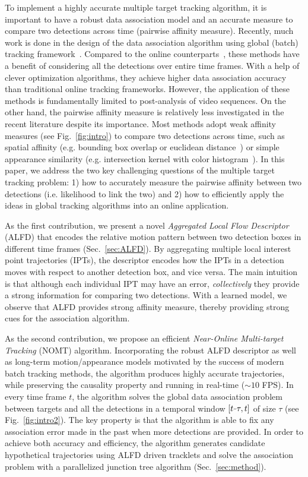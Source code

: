\documentclass[10pt,twocolumn,letterpaper]{article}
\newcommand{\minus}{\scalebox{0.5}[1.0]{$-$}}
\begin{document}
To implement a highly accurate multiple target tracking algorithm, it is important to have a robust data association model and an accurate measure to compare two detections across time (pairwise affinity measure). Recently, much work is done in the design of the data association algorithm using global (batch) tracking framework~\cite{BerclazFTF11,Kuo_CVPR_10,Milan:2014:CEM,Zhang_CVPR_08}. 
Compared to the online counterparts~\cite{BreitensteinICCV09,choi_pami13,Ess_PAMI_09,Khan_PAMI_05}, these methods have a benefit of considering all the detections over entire time frames. With a help of clever optimization algorithms, they achieve higher data association accuracy than traditional online tracking frameworks. However, the application of these methods is fundamentally limited to post-analysis of video sequences. 
On the other hand, the pairwise affinity measure is relatively less investigated in the recent literature despite its importance. Most methods adopt weak affinity measures (see Fig.~\ref{fig:intro}) to compare two detections across time, such as spatial affinity (e.g. bounding box overlap or euclidean distance~\cite{Andriyenko:2012:DCO,BerclazFTF11,Pirsiavash_CVPR_11}) or simple appearance similarity (e.g. intersection kernel with color histogram~\cite{ZamirECCV12}). In this paper, we address the two key challenging questions of the multiple target tracking problem: 1) how to accurately measure the pairwise affinity between two detections (i.e. likelihood to link the two) and 2) how to efficiently apply the ideas in global tracking algorithms into an online application. 

As the first contribution, we present a novel \emph{Aggregated Local Flow Descriptor} (ALFD) that encodes the relative motion pattern between two detection boxes in different time frames (Sec.~\ref{sec:ALFD}). By aggregating multiple local interest point trajectories (IPTs), the descriptor encodes how the IPTs in a detection moves with respect to another detection box, and vice versa. The main intuition is that although each individual IPT may have an error, \emph{collectively} they provide a strong information for comparing two detections. With a learned model, we observe that ALFD provides strong affinity measure, thereby providing strong cues for the association algorithm. 
 
As the second contribution, we propose an efficient \emph{Near-Online Multi-target Tracking} (NOMT) algorithm. Incorporating the robust ALFD descriptor as well as long-term motion/appearance models motivated by the success of modern batch tracking methods, the algorithm produces highly accurate trajectories, while preserving the causality property and running in real-time ($\sim 10$ FPS). In every time frame $t$, the algorithm solves the global data association problem between targets and all the detections in a temporal window $[t\minus\tau, t]$ of size $\tau$ (see Fig.~\ref{fig:intro2}). The key property is that the algorithm is able to fix any association error made in the past when more detections are provided. In order to achieve both accuracy and efficiency, the algorithm generates candidate hypothetical trajectories using ALFD driven tracklets and solve the association problem with a parallelized junction tree algorithm (Sec.~\ref{sec:method}). 
\end{document}
